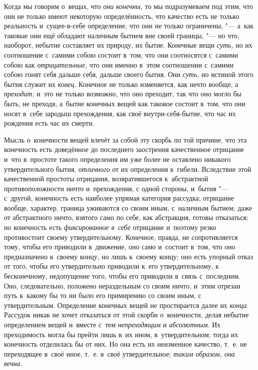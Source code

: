 Когда мы говорим о~вещах, что {\em они конечны,} то мы
подразумеваем под этим, что они не только имеют некоторую определённость,
что качество есть не только реальность и~сущее-в-себе определение, что они не
только ограничены, "--- а~как таковые они ещё обладают наличным бытием вне
своей границы, "--- но что, наоборот, небытие составляет их природу, их бытие.
Конечные вещи {\em суть,} но их соотношение с~самими
собою состоит в~том, что они соотносятся с~самими собою как
{\em отрицательные,} что они именно в~этом соотношении
с~самими собою гонят себя дальше себя, дальше своего бытия. Они
{\em суть,} но истиной этого бытия служит их
{\em конец}. Конечное не только изменяется, как нечто
вообще, а {\em преходит;} и~это не только возможно, что
оно преходит, так что оно могло бы быть, не преходя, а~бытие конечных вещей
как таковое состоит в~том, что они носят в~себе зародыш прехождения, как
своё внутри-себя-бытие, что час их рождения есть час их смерти.

\label{ssssec:alpha}

Мысль о~конечности вещей влечёт за собой эту скорбь по той причине, что эта
конечность есть доведённое до последнего заострения качественное отрицание
и~что в~простоте такого определения им уже более не оставлено никакого
утвердительного бытия, {\em отличного} от их
определения к~гибели. Вследствие этой качественной простоты отрицания,
возвратившегося к~абстрактной противоположности ничто и~прехождения, с
одной стороны, и~бытия "--- с~другой, конечность есть наиболее упрямая
категория рассудка; отрицание вообще, характер, граница уживаются со своим
иным, с~наличным бытием; даже от абстрактного ничто, взятого само по
себе, как абстракция, готовы отказаться; но конечность есть
{\em фиксированное в~себе} отрицание и~поэтому резко
противостоит своему утвердительному. Конечное, правда, не сопротивляется
тому, чтобы его приводили в~движение, оно само и~состоит в~том, что оно
предназначено к~своему концу, но лишь к~своему концу; оно есть упорный
отказ от того, чтобы его утвердительно приводили к~его утвердительному, к
бесконечному, недопущение того, чтобы его приводили в~связь с~последним.
Оно, следовательно, положено нераздельным со своим ничто, и~этим отрезан
путь к~какому бы то ни было его примирению со своим иным, с
утвердительным. Определение конечных вещей не простирается далее их
{\em конца}. Рассудок никак не хочет отказаться от этой
скорби о~конечности, делая небытие определением вещей и~вместе с~тем
{\em непреходящим} и
{\em абсолютным}. Их преходимость могла бы прейти лишь
в~их ином, в~утвердительном; тогда их конечность отделилась бы от них. Но
она есть их неизменное качество, т.~е. не переходящее в~своё иное, т.~е.
в~своё утвердительное; {\em таким образом, она вечна}.

